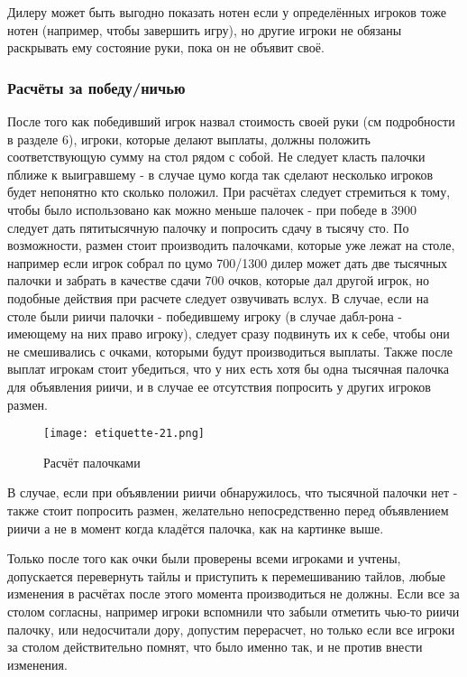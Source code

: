 Дилеру может быть выгодно показать нотен если у определённых игроков тоже нотен (например, чтобы завершить игру), но другие игроки не обязаны раскрывать ему состояние руки, пока он не объявит своё.

\subsubsection{Расчёты за победу/ничью}

После того как победивший игрок назвал стоимость своей руки (см подробности в разделе 6), игроки, которые делают выплаты, должны положить соответствующую сумму на стол рядом с собой. Не следует класть палочки пближе к выигравшему - в случае цумо когда так сделают несколько игроков будет непонятно кто сколько положил. При расчётах следует стремиться к тому, чтобы было использовано как можно меньше палочек - при победе в 3900 следует дать пятитысячную палочку и попросить сдачу в тысячу сто. По возможности, размен стоит производить палочками, которые уже лежат на столе, например если игрок собрал по цумо 700/1300 дилер может дать две тысячных палочки и забрать в качестве сдачи 700 очков, которые дал другой игрок, но подобные действия при расчете следует озвучивать вслух. В случае, если на столе были риичи палочки - победившему игроку (в случае дабл-рона - имеющему на них право игроку), следует сразу подвинуть их к себе, чтобы они не смешивались с очками, которыми будут производиться выплаты. Также после выплат игрокам стоит убедиться, что у них есть хотя бы одна тысячная палочка для объявления риичи, и в случае ее отсутствия попросить у других игроков размен.

\begin{figure}[H]
	\centering
	\texttt{[image: etiquette-21.png]}
	\caption{Расчёт палочками}
\end{figure}

В случае, если при объявлении риичи обнаружилось, что тысячной палочки нет - также стоит попросить размен, желательно непосредственно перед объявлением риичи а не в момент когда кладётся палочка, как на картинке выше.

Только после того как очки были проверены всеми игроками и учтены, допускается перевернуть тайлы и приступить к перемешиванию тайлов, любые изменения в расчётах после этого момента производиться не должны. Если все за столом согласны, например игроки вспомнили что забыли отметить чью-то риичи палочку, или недосчитали дору, допустим перерасчет, но только если все игроки за столом действительно помнят, что было именно так, и не против внести изменения.

